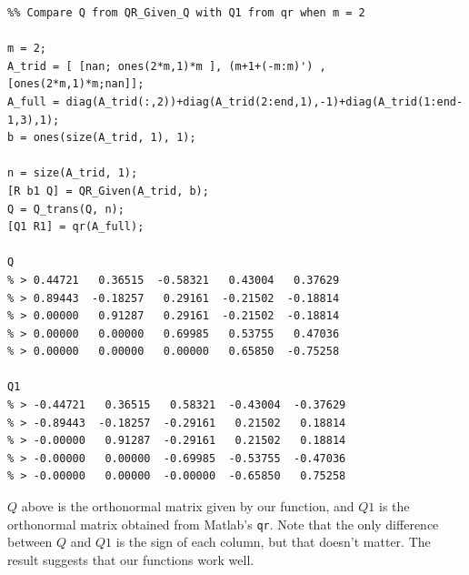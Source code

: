 \documentclass[12pt,oneside,a4paper]{article}
\newcommand{\m}[1]{\texttt{{#1}}}
\begin{document}
\begin{lstlisting}
%% Compare Q from QR_Given_Q with Q1 from qr when m = 2

m = 2;
A_trid = [ [nan; ones(2*m,1)*m ], (m+1+(-m:m)') , [ones(2*m,1)*m;nan]];
A_full = diag(A_trid(:,2))+diag(A_trid(2:end,1),-1)+diag(A_trid(1:end-1,3),1);
b = ones(size(A_trid, 1), 1);

n = size(A_trid, 1);
[R b1 Q] = QR_Given(A_trid, b);
Q = Q_trans(Q, n);
[Q1 R1] = qr(A_full);

Q
% > 0.44721   0.36515  -0.58321   0.43004   0.37629
% > 0.89443  -0.18257   0.29161  -0.21502  -0.18814
% > 0.00000   0.91287   0.29161  -0.21502  -0.18814
% > 0.00000   0.00000   0.69985   0.53755   0.47036
% > 0.00000   0.00000   0.00000   0.65850  -0.75258

Q1
% > -0.44721   0.36515   0.58321  -0.43004  -0.37629
% > -0.89443  -0.18257  -0.29161   0.21502   0.18814
% > -0.00000   0.91287  -0.29161   0.21502   0.18814
% > -0.00000   0.00000  -0.69985  -0.53755  -0.47036
% > -0.00000   0.00000  -0.00000  -0.65850   0.75258
\end{lstlisting}

$Q$ above is the orthonormal matrix given by our function, and $Q1$ is the orthonormal matrix obtained from Matlab's \m{qr}. Note that the only difference between $Q$ and $Q1$ is the sign of each column, but that doesn't matter. The result suggests that our functions work well.
\end{document}
